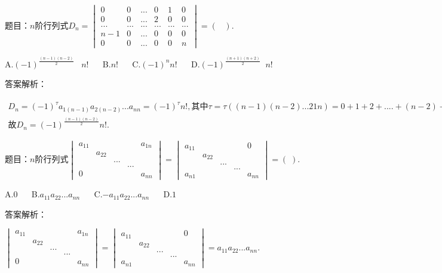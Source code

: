 题目：$n\mathrm{阶行列式}D_n=\begin{vmatrix}0&0&...&0&1&0\\0&0&...&2&0&0\\...&...&...&...&...&...\\n-1&0&...&0&0&0\\0&0&...&0&0&n\end{vmatrix}=(\;\;\;).$

A.$(-1)^\frac{(n-1)(n-2)}2\;\;\;n!$ $\quad$ B.$n!$ $\quad$ C.$(-1)^nn!$ $\quad$ D.$(-1)^\frac{(n+1)(n+2)}2\;\;n!$

答案解析：

$\begin{array}{l}D_n=(-1)^\tau a_{1(n-1)}a_{2(n-2)}...a_{nn}=(-1)^\tau n!,\mathrm{其中}\tau=\tau((n-1)(n-2)...21n)=0+1+2+....+(n-2)+0=\frac{(n-1)(n-2)}2\\故D_n=(-1)^\frac{(n-1)(n-2)}2n!.\end{array}$



题目：$n\mathrm{阶行列式}\begin{vmatrix}a_{11}&&&&a_{1n}\\&a_{22}&&&\\&&...&&\\&&&...&\\0&&&&a_{nn}\end{vmatrix}=\begin{vmatrix}a_{11}&&&&0\\&a_{22}&&&\\&&...&&\\&&&...&\\a_{n1}&&&&a_{nn}\end{vmatrix}=(\;).$

A.$0$ $\quad$ B.$a_{11}a_{22}...a_{nn}$ $\quad$ C.$-a_{11}a_{22}...a_{nn}$ $\quad$ D.$1$

答案解析：

$\begin{vmatrix}a_{11}&&&&a_{1n}\\&a_{22}&&&\\&&...&&\\&&&...&\\0&&&&a_{nn}\end{vmatrix}=\begin{vmatrix}a_{11}&&&&0\\&a_{22}&&&\\&&...&&\\&&&...&\\a_{n1}&&&&a_{nn}\end{vmatrix}=a_{11}a_{22}...a_{nn}.$



